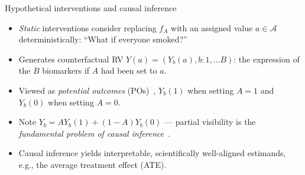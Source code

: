 \documentclass{beamer}
\begin{document}

\begin{frame}[c]{Hypothetical interventions and causal inference}
\begin{center}
\begin{itemize}
  \itemsep6pt
  \item \textit{Static} interventions consider replacing $f_A$ with an assigned
    value $a \in \mathcal{A}$ deterministically: ``What if everyone smoked?''
  \item Generates counterfactual RV $Y(a) = (Y_b(a), b: 1, \ldots B)$: the
    expression of the $B$ biomarkers if $A$ had been set to $a$.
  \item Viewed as \textit{potential outcomes} (POs)~\citep{rubin2005causal},
    $Y_b(1)$ when setting $A=1$ and $Y_b(0)$ when setting $A = 0$.
  \item Note $Y_b = A Y_b(1) + (1 - A) Y_b(0)$ --- partial visibility is the
    \textit{fundamental problem of causal
    inference}~\citep{holland1986statistics}.
  \item Causal inference yields interpretable, scientifically well-aligned
    estimands, e.g., the average treatment effect (ATE).
\end{itemize}
\end{center}

\end{frame}

\end{document}
